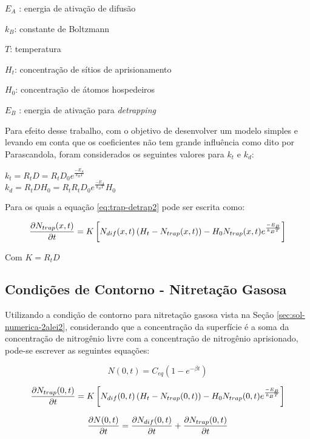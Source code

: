 $E_A$ : energia de ativação de difusão

$k_B$: constante de Boltzmann 
	
$T$: temperatura

$H_t$: concentração de sítios de aprisionamento

$H_0$: concentração de átomos hospedeiros
	
$E_B$ : energia de ativação para \textit{detrapping}

Para efeito desse trabalho, com o objetivo de desenvolver um modelo simples e levando em conta que os coeficientes não tem grande influência como dito por Parascandola, foram considerados os seguintes valores para $k_t$ e $k_d$:
\begin{center}
$k_t = R_tD = R_tD_0e^{\frac{-E_A}{k_BT}}$ \\ $k_d = R_tDH_0 = R_tR_tD_0e^{\frac{-E_A}{k_BT}}H_0$
\end{center}

Para os quais a equação \ref{eq:trap-detrap2} pode ser escrita como:

\begin{equation}
\label{eq:trap-detrap2-me}
\pdv{N_{trap}(x,t)}{t} = K\left[N_{dif}(x,t)\left(H_t-N_{trap}(x,t)\right) - H_0 N_{trap}(x,t)e^{\frac{-E_B}{k_BT}}\right] 
\end{equation}

Com $K=R_tD$

\subsection{Condições de Contorno - Nitretação Gasosa}
\label{sec:trap-detrap-gas-cc}
Utilizando a condição de contorno para nitretação gasosa vista na Seção \ref{sec:sol-numerica-2alei2}, considerando que a concentração da superfície é a soma da concentração de nitrogênio livre com a concentração de nitrogênio aprisionado, pode-se escrever as seguintes equações:

\begin{equation}
\label{eq:trap-detrap-gas-cc1}
N(0,t) = C_{eq}(1 - e^{-\beta t})
\end{equation}

\begin{equation}
\label{eq:trap-detrap-gas-cc2}
\pdv{N_{trap}(0,t)}{t} = K\left[N_{dif}(0,t)\left(H_t-N_{trap}(0,t)\right) - H_0 N_{trap}(0,t)e^{\frac{-E_B}{k_BT}}\right] 
\end{equation}

\begin{equation}
\label{eq:trap-detrap-gas-cc3}
\pdv{N(0,t)}{t} = \pdv{N_{dif}(0,t)}{t} + \pdv{N_{trap}(0,t)}{t}
\end{equation}

